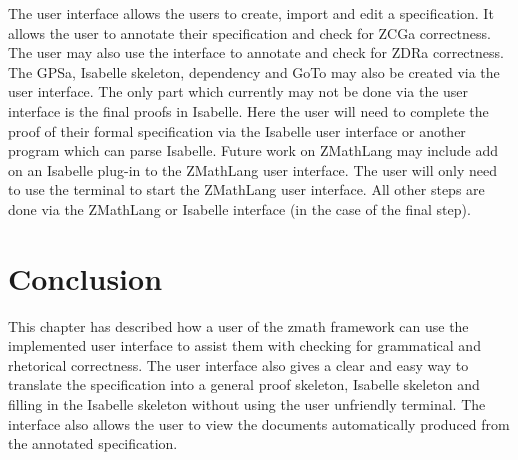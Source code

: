 The user interface allows the users to create, import and edit a specification. It allows the
user to annotate their specification and check for ZCGa correctness. The user may also use the
interface to annotate and check for ZDRa correctness. The GPSa, Isabelle skeleton, dependency 
and GoTo may also be created via the user interface. The only part which currently may not be
done via the user interface is the final proofs in Isabelle. Here the user will need to complete
 the proof of their formal specification via the Isabelle user interface or another program 
 which can parse Isabelle. Future work on ZMathLang may include add on an Isabelle plug-in to 
 the ZMathLang user interface.
 The user will only need to use the terminal to start the ZMathLang user interface. All other
  steps are done via the ZMathLang or Isabelle interface (in the case of the final step).

\section{Conclusion}
This chapter has described how a user of the \gls{zmath} framework can use the
implemented user interface to assist them with checking for grammatical and
rhetorical correctness. The user interface also gives a clear and easy way to
translate the specification into a general proof skeleton, Isabelle skeleton and
filling in the Isabelle skeleton without using the user unfriendly terminal. The
interface also allows the user to view the documents automatically produced from
the annotated specification.
